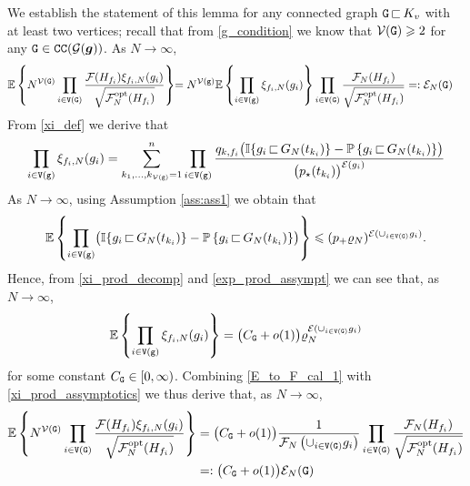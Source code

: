 \documentclass[11pt,reqno]{amsart}
\numberwithin{equation}{section}
\newcommand{\E}[1]{\mathbb{E}\left\{ #1\right\}}
\newcommand{\pk}[1]{\mathbb{P} \left\{ #1 \right \} }
\newcommand{\kb}[1]{\boldsymbol{#1}}
\newcommand{\vk}[1]{\kb{#1}}
\begin{document}
We establish the statement of this lemma for any connected graph ${\tt G}{\,\sqsubset\,} K_v$ with at least two vertices; recall that from \eqref{g_condition} we know that $\mathcal{V}({\tt G})\geqslant 2$ for any ${\tt G}\in{\tt CC}(\mathcal{G}(\vk g))$.
As $N\to\infty$,
\begin{align} 
    \E{N^{\mathcal{V}({\tt G})}\prod_{i\in{\tt V}({\tt G})}\frac{\mathcal{F}({H}_{f_i})\xi_{f_i, {N}}(g_i)}{\sqrt{\mathcal{F}^{\rm opt}_N({H}_{f_i})}}}&{=N^{\mathcal{V({\tt g})}}\E{\prod_{i\in{\tt V}({\tt g})}\xi_{f_i,N}(g_i)}\prod_{i\in{\tt V}({\tt G})}\frac{\mathcal{F}_N({H}_{f_i})}{\sqrt{\mathcal{F}_N^{\rm{opt}}({H}_{f_i})}}=:\mathcal{E}_{N}({\tt G})}\label{E_to_F_cal_1}
\end{align}
From \eqref{xi_def} we derive that
\begin{align}
    \prod_{i\in{\tt V}({\tt g})}\xi_{f_i,N}(g_i) = \sum_{k_1,\ldots, k_{\mathcal{V}({\tt g})}=1}^{n}\prod_{i\in{\tt V}({\tt g})}\frac{q_{k,f_i}\bigl(\mathbb{I}\{g_i{\,\sqsubset\,} G_N(t_{k_i})\} - \pk{g_i{\,\sqsubset\,} G_N(t_{k_i})}\bigr)}{\bigl(p_{\star}(t_{k_i})\bigr)^{\mathcal{E}(g_i)}}\label{xi_prod_decomp}
\end{align} As $N\to\infty$, using Assumption \ref{ass:ass1} we obtain that
\begin{align}
\E{\prod_{i\in{\tt V}({\tt g})}\bigl(\mathbb{I}\{g_i{\,\sqsubset\,} G_N(t_{k_i})\} - \pk{g_i{\,\sqsubset\,} G_N(t_{k_i})}\bigr)} \leqslant (p_+\varrho_N)^{\mathcal{E}(\cup_{i\in{\tt V}({\tt G})} g_i)}.\label{exp_prod_assympt}
\end{align}
Hence, from \eqref{xi_prod_decomp} and \eqref{exp_prod_assympt} we can see that, as $N\to\infty$,
\begin{align}
    \E{\prod_{i\in{\tt V}({\tt g})}\xi_{f_i,N}(g_i)} = \bigl(C_{{\tt G}}+o(1)\bigr)\varrho_N^{\mathcal{E}(\cup_{i\in{\tt V}({\tt G})} g_i)}\label{xi_prod_assymptotics}
\end{align}
for some constant $C_{{\tt G}}\in[0,\infty)$. Combining \eqref{E_to_F_cal_1} with \eqref{xi_prod_assymptotics} we thus derive that, as $N\to\infty$,
\begin{align} 
    \E{N^{\mathcal{V}({\tt G})}\prod_{i\in{\tt V}({\tt G})}\frac{\mathcal{F}({H}_{f_i})\xi_{f_i, {N}}(g_i)}{\sqrt{\mathcal{F}^{\rm opt}_N({H}_{f_i})}}}&=\bigl(C_{{\tt G}}+o(1)\bigr)\frac{1}{\mathcal{F}_N\left(\cup_{i\in{\tt V}({\tt G})} g_i\right)}\prod_{i\in{\tt V}({\tt G})}\frac{\mathcal{F}_N({H}_{f_i})}{\sqrt{\mathcal{F}_N^{\rm{opt}}({H}_{f_i})}}\label{E_to_F_cal}\\
    &=:\bigl(C_{{\tt G}}+o(1)\bigr)\mathcal{E}_{N}({\tt G})\notag
\end{align}
\end{document}
